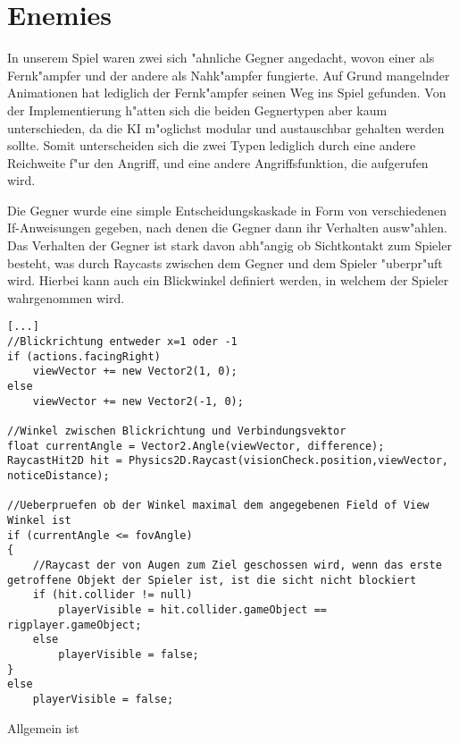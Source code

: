 \chapter{Enemies}
In unserem Spiel waren zwei sich "ahnliche Gegner angedacht, wovon einer als Fernk"ampfer und der andere als Nahk"ampfer fungierte. Auf Grund mangelnder Animationen hat lediglich der Fernk"ampfer seinen Weg ins Spiel gefunden. Von der Implementierung h"atten sich die beiden Gegnertypen aber kaum unterschieden, da die KI m"oglichst modular und austauschbar gehalten werden sollte. Somit unterscheiden sich die zwei Typen lediglich durch eine andere Reichweite f"ur den Angriff, und eine andere Angriffsfunktion, die aufgerufen wird.\newline

Die Gegner wurde eine simple Entscheidungskaskade in Form von verschiedenen If-Anweisungen gegeben, nach denen die Gegner dann ihr Verhalten ausw"ahlen. Das Verhalten der Gegner ist stark davon abh"angig ob Sichtkontakt zum Spieler besteht, was durch Raycasts zwischen dem Gegner und dem Spieler "uberpr"uft wird.  Hierbei kann auch ein Blickwinkel definiert werden, in welchem der Spieler wahrgenommen wird.

\begin{lstlisting}[breaklines=true]
[...]
//Blickrichtung entweder x=1 oder -1
if (actions.facingRight)
    viewVector += new Vector2(1, 0);
else
    viewVector += new Vector2(-1, 0);

//Winkel zwischen Blickrichtung und Verbindungsvektor
float currentAngle = Vector2.Angle(viewVector, difference);
RaycastHit2D hit = Physics2D.Raycast(visionCheck.position,viewVector, noticeDistance);

//Ueberpruefen ob der Winkel maximal dem angegebenen Field of View Winkel ist
if (currentAngle <= fovAngle)
{
    //Raycast der von Augen zum Ziel geschossen wird, wenn das erste getroffene Objekt der Spieler ist, ist die sicht nicht blockiert
    if (hit.collider != null)
        playerVisible = hit.collider.gameObject == rigplayer.gameObject;
	else
		playerVisible = false;
}
else
	playerVisible = false;

\end{lstlisting}

Allgemein ist 

\begin{lstlisting}[breaklines=true]

\end{lstlisting}